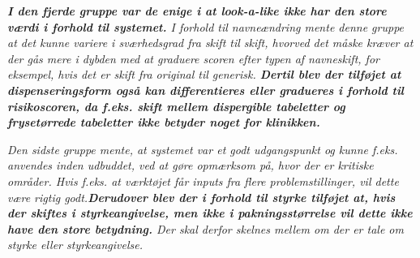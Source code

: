\textit{\textbf{I den fjerde gruppe var de enige i at look-a-like ikke har den store værdi i forhold til systemet.} I forhold til navneændring mente denne gruppe at det kunne variere i sværhedsgrad fra skift til skift, hvorved det måske kræver at der gås mere i dybden med at graduere scoren efter typen af navneskift, for eksempel, hvis det er skift fra original til generisk. \textbf{Dertil blev der tilføjet at dispenseringsform også kan differentieres eller gradueres i forhold til risikoscoren, da f.eks. skift mellem dispergible tabeletter og frysetørrede tabeletter ikke betyder noget for klinikken.}}

\textit{
Den sidste gruppe mente, at systemet var et godt udgangspunkt og kunne f.eks. anvendes inden udbuddet, ved at gøre opmærksom på, hvor der er kritiske områder. Hvis f.eks. at værktøjet får inputs fra flere problemstillinger, vil dette være rigtig godt.\textbf{Derudover blev der i forhold til styrke tilføjet at, hvis der skiftes i styrkeangivelse, men ikke i pakningsstørrelse vil dette ikke have den store betydning.} Der skal derfor skelnes mellem om der er tale om styrke eller styrkeangivelse.}